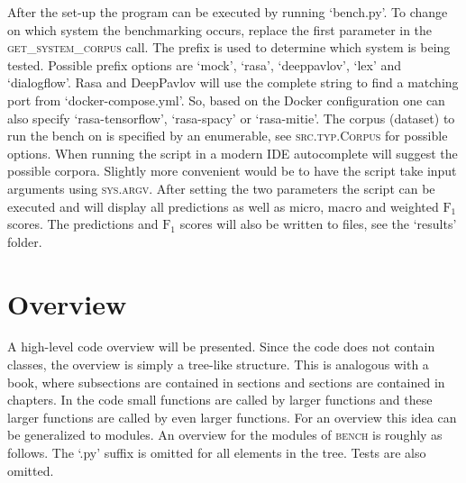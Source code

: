 After the set-up the program can be executed by running `bench.py'.
To change on which system the benchmarking occurs, replace the first parameter in the \textsc{get\_system\_corpus} call.
The prefix is used to determine which system is being tested.
Possible prefix options are `mock', `rasa', `deeppavlov', `lex' and `dialogflow'.
Rasa and DeepPavlov will use the complete string to find a matching port from `docker-compose.yml'.
So, based on the Docker configuration one can also specify `rasa-tensorflow', `rasa-spacy' or `rasa-mitie'.
The corpus (dataset) to run the bench on is specified by an enumerable, see \textsc{src.typ.Corpus} for possible options.
When running the script in a modern IDE autocomplete will suggest the possible corpora.
Slightly more convenient would be to have the script take input arguments using \textsc{sys.argv}.
After setting the two parameters the script can be executed and will display all predictions as well as micro, macro and weighted $\text{F}_1$ scores.
The predictions and $\text{F}_1$ scores will also be written to files, see the `results' folder.

\section{Overview}
\label{sec:overview}
A high-level code overview will be presented.
Since the code does not contain classes, the overview is simply a tree-like structure.
This is analogous with a book, where subsections are contained in sections and sections are contained in chapters.
In the code small functions are called by larger functions and these larger functions are called by even larger functions.
For an overview this idea can be generalized to modules.
An overview for the modules of \textsc{bench} is roughly as follows.
The `.py' suffix is omitted for all elements in the tree.
Tests are also omitted.

